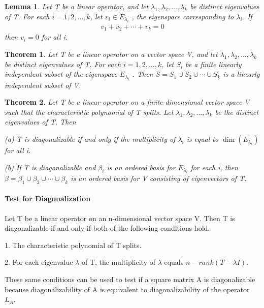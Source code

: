 \documentclass{article}
\theoremstyle{plain}
\newtheorem{theorem}{Theorem}[section]
\newtheorem*{lemma}{Lemma}
\theoremstyle{plain} %
\begin{document}
\begin{lemma}
  Let T be a linear operator, and let $\lambda_1, \lambda_2,\ldots,\lambda_k$ be distinct eigenvalues of T. For each $i = 1, 2,\ldots,k$, let $v_i \in E_{\lambda_i}$ , the eigenspace corresponding to $\lambda_i$. If
  \begin{align*}
    v_1+v_2+\cdots+v_k=0
  \end{align*}
  then $v_i = 0$ for all i.
\end{lemma}

\begin{theorem}
  Let T be a linear operator on a vector space V, and let $\lambda_1, \lambda_2,\ldots,\lambda_k$ be distinct eigenvalues of T. For each $i = 1, 2,\ldots,k$, let $S_i$ be a finite linearly independent subset of the eigenspace $E_{\lambda_i}$ . Then $S = S_1 \cup S_2 \cup\cdots \cup S_k$ is a linearly independent subset of V.
\end{theorem}

\begin{theorem}
  Let T be a linear operator on a finite-dimensional vector space V such that the characteristic polynomial of T splits. Let $\lambda_1, \lambda_2,\ldots,\lambda_k$ be the distinct eigenvalues of T. Then 
  
  (a) T is diagonalizable if and only if the multiplicity of $\lambda_i$ is equal to $\dim(E_{\lambda_i})$ for all i.

  (b) If T is diagonalizable and $\beta_i$ is an ordered basis for $E_{\lambda_i}$ for each i, then $\beta = \beta_1\cup \beta_2\cup\cdots \cup\beta_k$ is an ordered basis for V consisting of eigenvectors of T.
\end{theorem}

\paragraph{Test for Diagonalization}

Let T be a linear operator on an n-dimensional vector space V. Then T is diagonalizable if and only if both of the following conditions hold.

1. The characteristic polynomial of T splits.

2. For each eigenvalue $\lambda$ of T, the multiplicity of $\lambda$ equals $n−rank(T−\lambda I)$.

These same conditions can be used to test if a square matrix A is diagonalizable because diagonalizability of A is equivalent to diagonalizability of the operator $L_A$.
\end{document}
